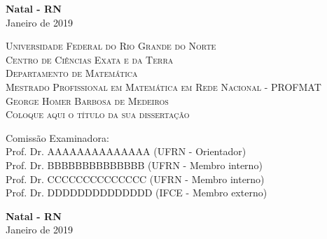 \documentclass[12pt, a4paper, oneside]{book}
\begin{document}
\vspace{8cm}


\begin{center}
\textbf{Natal - RN} \\
Janeiro de 2019
\end{center}


%

%
\newpage
\thispagestyle{empty}
	\begin{center}
		\textsc{ Universidade Federal do Rio Grande do Norte \\ Centro de Ciências Exata e da Terra \\ Departamento de Matemática \\	Mestrado Profissional em Matemática em Rede Nacional - PROFMAT}\\
	
	\vspace{3cm}
	\textsc{George Homer Barbosa de Medeiros}\\
	\vspace{3cm}
	\textsc{\Huge{Coloque aqui o título da sua dissertação}}
	\end{center}
	\vspace{4cm}
Comissão Examinadora:\vspace{0,5cm}\\
Prof. Dr. AAAAAAAAAAAAAA (UFRN - Orientador)\\
Prof. Dr. BBBBBBBBBBBBBB  (UFRN - Membro interno)\\
Prof. Dr. CCCCCCCCCCCCCC (UFRN - Membro interno)\\
Prof. Dr. DDDDDDDDDDDDDD  (IFCE - Membro externo)\\
\vspace{4cm}

\begin{center}
	\textbf{Natal - RN} \\
	Janeiro de 2019
\end{center}








\pagestyle{myheadings} %
\newpage
\thispagestyle{empty}
\end{document}
